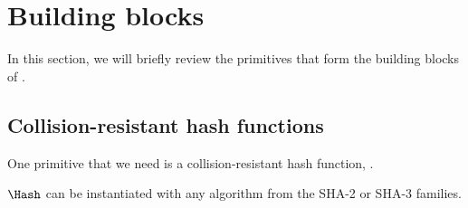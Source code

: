 \section{Building blocks}%
\label{Primitives}\label{BuildingBlocks}

In this section, we will briefly review the primitives that form the building blocks of \PRIVO.

\subsection{Collision-resistant hash functions}


One primitive that we need is a collision-resistant hash function, \Hash.


\(\Hash\) can be instantiated with any algorithm from the SHA-2 or SHA-3 families.





%







